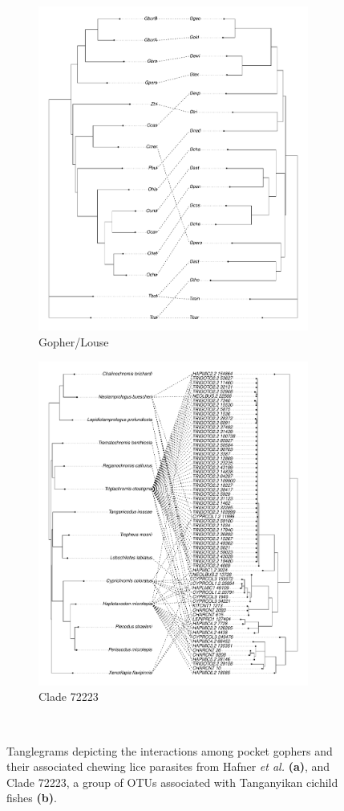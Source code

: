 
\begin{figure}
    \centering
    \begin{subfigure}[b]{0.45\textwidth}
        \includegraphics[width=3.5in]{FishPoo/figures/codiv_gopher_louse}
        \small
        \caption{Gopher/Louse}
    \end{subfigure}
    \begin{subfigure}[b]{0.45\textwidth}
        \includegraphics[width=3.5in]{FishPoo/figures/codiv_clade_72223}
        \small
        \caption{Clade 72223}
    \end{subfigure}\\
    \caption{Tanglegrams depicting the interactions among pocket gophers and their associated chewing lice parasites from Hafner {\em et al.} \cite{hafner1994disparate} \textbf{(a)}, and Clade 72223, a group of OTUs associated with Tanganyikan cichild fishes \textbf{(b)}.}
    \label{fig:FP_tangles}
\end{figure}